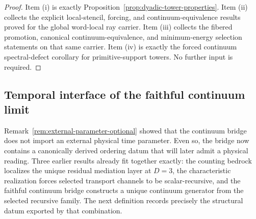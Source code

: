 \begin{proof}
Item (i) is exactly Proposition~\ref{prop:dyadic-tower-properties}. Item (ii)
collects the explicit local-stencil, forcing, and continuum-equivalence
results proved for the global word-local ray carrier. Item (iii) collects the
fibered promotion, canonical continuum-equivalence, and minimum-energy
selection statements on that same carrier. Item (iv) is exactly the forced
continuum spectral-defect corollary for primitive-support towers. No further
input is required.
\end{proof}

\subsection{Temporal interface of the faithful continuum limit}

Remark~\ref{rem:external-parameter-optional} showed that the continuum bridge
does not import an external physical time parameter. Even so, the bridge now
contains a canonically derived ordering datum that will later admit a physical
reading. Three earlier results already fit together exactly:
the counting bedrock localizes the unique residual mediation layer at
\(D=3\), the characteristic realization forces selected transport channels to
be scalar-recursive, and the faithful continuum bridge constructs a unique
continuum generator from the selected recursive family. The next
definition records precisely the structural datum exported by that
combination.

